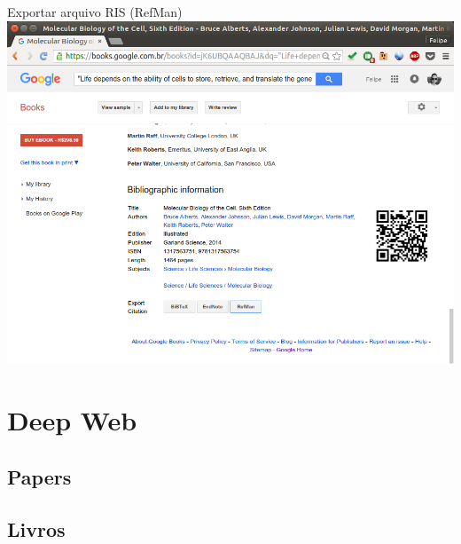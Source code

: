 \documentclass{beamer}
\begin{document}
\begin{frame}{Exportar arquivo RIS (RefMan)}
  \includegraphics[height=.85\textheight]{Busca/gbooks-about2}
\end{frame}

\section{Deep Web}

\subsection{Papers}

\subsection{Livros}
\end{document}
